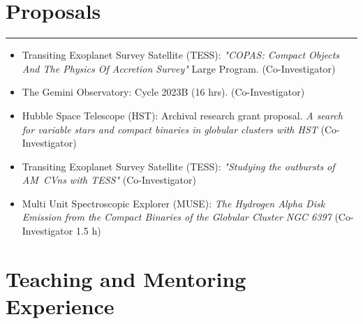 \documentclass[letterpaper,10pt]{article}
\begin{document}
\section*{Proposals}       

\hrule
\vspace{.3 cm}


\begin{itemize}[label=$\blacktriangleright$]
      \item   Transiting Exoplanet Survey Satellite (TESS): \emph{"COPAS: Compact Objects And The Physics Of Accretion Survey"} Large Program. (Co-Investigator)
  \end{itemize}

\begin{itemize}[label=$\blacktriangleright$]
      \item   The Gemini Observatory:  Cycle 2023B (16 hrs). (Co-Investigator)
  \end{itemize}




  \begin{itemize}[label=$\blacktriangleright$]
      \item Hubble Space Telescope (HST):  Archival research grant proposal. \emph{A search for variable stars and compact binaries in globular clusters with HST } (Co-Investigator)
  \end{itemize}
  
  

\begin{itemize}[label=$\blacktriangleright$]
      \item   Transiting Exoplanet Survey Satellite (TESS): \emph{"Studying the outbursts of AM~CVns with TESS"} (Co-Investigator)
  \end{itemize}


  \begin{itemize}[label=$\blacktriangleright$]
        \item Multi Unit Spectroscopic Explorer (MUSE): \emph{The Hydrogen Alpha Disk Emission from the Compact Binaries of the Globular Cluster NGC 6397} (Co-Investigator 1.5 h)
  \end{itemize}


\section*{Teaching and Mentoring Experience}
\end{document}
